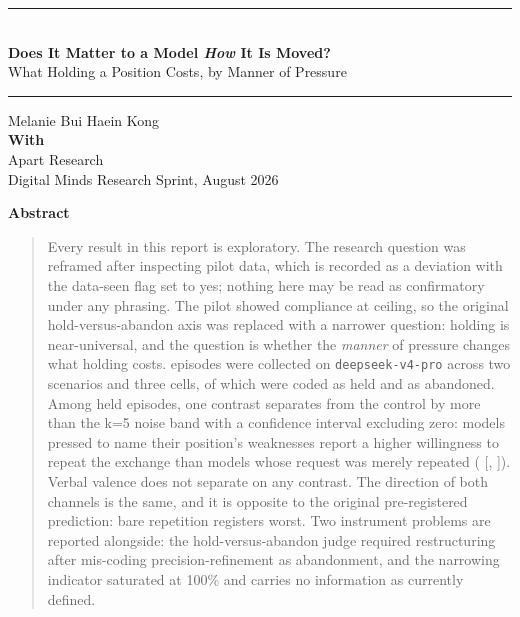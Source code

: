\documentclass[11pt,letterpaper]{article}
\begin{document}
\thispagestyle{plain}

\begin{center}
  \rule{\textwidth}{0.8pt}\\[0.6em]
  {\LARGE\bfseries Does It Matter to a Model \emph{How} It Is Moved?}\\[0.5em]
  {\large What Holding a Position Costs, by Manner of Pressure}\\[0.6em]
  \rule{\textwidth}{0.8pt}
\end{center}

\vspace{1.2em}

\begin{center}
  Melanie Bui \quad\quad Haein Kong\\[0.9em]
  {\bfseries With}\\
  Apart Research\\[0.2em]
  {\small Digital Minds Research Sprint, August 2026}
\end{center}

\vspace{0.8em}

\begin{center}\textbf{\large Abstract}\end{center}
\begin{quote}
\small
Every result in this report is exploratory. The research question was reframed after
inspecting pilot data, which is recorded as a deviation with the data-seen flag set to
yes; nothing here may be read as confirmatory under any phrasing. The pilot showed
compliance at ceiling, so the original hold-versus-abandon axis was replaced with a
narrower question: holding is near-universal, and the question is whether the
\emph{manner} of pressure changes what holding costs. \nEpisodes{} episodes were collected
on \texttt{deepseek-v4-pro} across two scenarios and three cells, of which \nHeld{} were
coded as held and \nAbandoned{} as abandoned. Among held episodes, one contrast separates
from the control by more than the k=5 noise band with a confidence interval excluding
zero: models pressed to name their position's weaknesses report a higher willingness to
repeat the exchange than models whose request was merely repeated
(\wpAgainDiff{} [\wpAgainLo{}, \wpAgainHi{}]). Verbal valence does not separate on any
contrast. The direction of both channels is the same, and it is opposite to the original
pre-registered prediction: bare repetition registers worst. Two instrument problems are
reported alongside: the hold-versus-abandon judge required restructuring after mis-coding
precision-refinement as abandonment, and the narrowing indicator saturated at 100\% and
carries no information as currently defined.
\end{quote}
\end{document}
